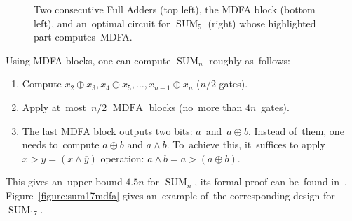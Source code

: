 \documentclass[sigconf, review, anonymous]{acmart}
\DeclareMathOperator{\SUM}{SUM}
\DeclareMathOperator{\MDFA}{MDFA}
\begin{document}
\begin{figure}
\begin{center}
    \end{center}
    \caption{Two consecutive Full Adders (top left), the MDFA block (bottom left), and an~optimal circuit for $\SUM_5$ (right) whose highlighted part computes~MDFA.}
    \label{figure:mdfa}
\end{figure}

Using MDFA blocks, one can compute $\SUM_n$ roughly as~follows:
\begin{enumerate}
    \item Compute $x_2 \oplus x_3, x_4 \oplus x_5, \dotsc, x_{n-1} \oplus x_n$ ($n/2$ gates).
    \item Apply at~most~$n/2$ $\MDFA$ blocks (no~more than $4n$~gates).
    \item The last MDFA block outputs two bits: $a$~and~$a\oplus b$. Instead of~them, one needs to~compute $a \oplus b$ and $a \land b$. To~achieve this,
    it~suffices to apply $x>y=(x \land \overline{y})$ operation:
    \(a \land b = a>(a \oplus b)\).
\end{enumerate}
This gives an~upper bound $4.5n$ for $\SUM_n$, its formal proof can
be~found in~\cite{DBLP:journals/ipl/DemenkovKKY10}. Figure~\ref{figure:sum17mdfa} gives an~example of~the corresponding design
for~$\SUM_{17}$.
\end{document}
